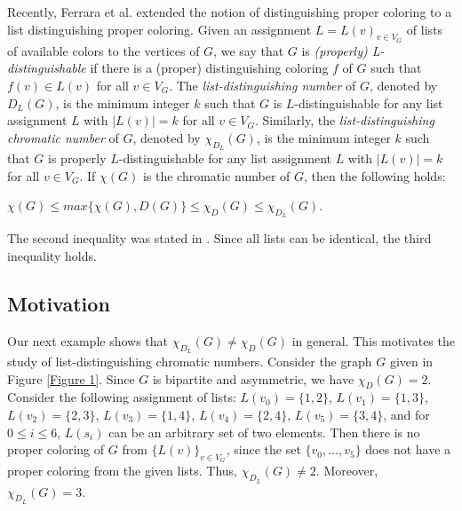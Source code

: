 \documentclass[12pt,reqno,a4paper]{amsart}
\theoremstyle{definition}
\begin{document}
Recently, Ferrara et al. \cite{FGHSW2013} extended the notion of distinguishing proper coloring to a list distinguishing proper coloring. Given an assignment $L = {L(v)}_{v\in V_{G}}$ of lists of available colors to the vertices of $G$, we say that $G$ is {\em (properly) L-distinguishable} if there is a (proper) distinguishing coloring $f$ of $G$ such that $f(v) \in L(v)$ for all $v\in V_{G}$. The {\em list-distinguishing number}
of $G$, denoted by $D_{L}(G)$, is the minimum integer $k$ such that $G$ is $L$-distinguishable for any list assignment $L$ with $\vert L(v)\vert = k$ for all $v\in V_{G}$. Similarly, the {\em list-distinguishing chromatic number} of $G$, denoted by $\chi_{D_{L}}(G)$, is the minimum integer $k$ such that $G$ is properly $L$-distinguishable for any list
assignment $L$ with $\vert L(v)\vert = k$ for all $v\in V_{G}$. If $\chi(G)$ is the chromatic number of $G$, then the following holds:

\begin{center}
$\chi(G)\leq max\{\chi(G), D(G)\} \leq \chi_{D}(G) \leq \chi_{D_{L}}(G)$.
\end{center}

The second inequality was stated in \cite{CT2006}. Since all lists can be identical, the third inequality holds.

\subsection{Motivation}
Our next example shows that $\chi_{D_L}(G)\neq \chi_D(G)$ in general. This motivates the study of list-distinguishing chromatic numbers.
Consider the graph $G$ given in Figure \ref{Figure 1}. Since $G$ is bipartite and asymmetric, we have $\chi_D(G) = 2$. Consider the following assignment of lists: $L(v_0) =\{1,2\}$, $L(v_1) = \{1,3\}$, $L(v_2) = \{2,3\}$, $L(v_3) = \{1,4\}$, $L(v_4) = \{2,4\}$, $L(v_5) =\{3,4\}$, and for $0\leq i \leq 6$, $L(s_i)$ can be an arbitrary set of two elements. Then there is no proper coloring of $G$ from $\{L(v)\}_{v\in V_G}$, since the set $\{v_0,\dots, v_5\}$ does not have a proper coloring from the given lists. Thus, $\chi_{D_L}(G) \neq 2$. Moreover, $\chi_{D_L}(G) = 3$.
\end{document}
